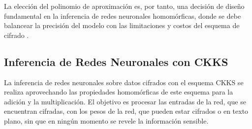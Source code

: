 La elección del polinomio de aproximación es, por tanto, una decisión de diseño fundamental en la inferencia de redes neuronales homomórficas, donde se debe balancear la precisión del modelo con las limitaciones y costos del esquema de cifrado \cite{benaissa2021tenseal}.

\subsection{Inferencia de Redes Neuronales con CKKS}
La inferencia de redes neuronales sobre datos cifrados con el esquema CKKS se realiza aprovechando las propiedades homomórficas de este esquema para la adición y la multiplicación. El objetivo es procesar las entradas de la red, que se encuentran cifradas, con los pesos de la red, que pueden estar cifrados o en texto plano, sin que en ningún momento se revele la información sensible.

